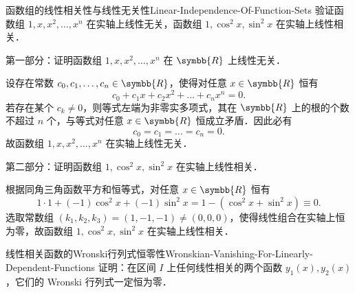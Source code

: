 \begin{problem}{函数组的线性相关性与线性无关性}{Linear-Independence-Of-Function-Sets}
    验证函数组 $1, x, x^2, \dots, x^n$ 在实轴上线性无关，函数组 $1, \cos^2 x, \sin^2 x$ 在实轴上线性相关．
\end{problem}

\begin{myproof}
    第一部分：证明函数组 $1, x, x^2, \dots, x^n$ 在 $\symbb{R}$ 上线性无关．

    设存在常数 $c_0, c_1, \dots, c_n \in \symbb{R}$，使得对任意 $x \in \symbb{R}$ 恒有
    \begin{equation}
        c_0 + c_1 x + c_2 x^2 + \dots + c_n x^n = 0.
    \end{equation}
    若存在某个 $c_k \neq 0$，则等式左端为非零实多项式，其在 $\symbb{R}$ 上的根的个数不超过 $n$ 个，与等式对任意 $x \in \symbb{R}$ 恒成立矛盾．因此必有
    \begin{equation}
        c_0 = c_1 = \dots = c_n = 0.
    \end{equation}
    故函数组 $1, x, x^2, \dots, x^n$ 在实轴上线性无关．

    第二部分：证明函数组 $1, \cos^2 x, \sin^2 x$ 在实轴上线性相关．

    根据同角三角函数平方和恒等式，对任意 $x \in \symbb{R}$ 恒有
    \begin{equation}
        1 \cdot 1 + (-1)\cos^2 x + (-1)\sin^2 x = 1 - (\cos^2 x + \sin^2 x) \equiv 0.
    \end{equation}
    选取常数组 $(k_1, k_2, k_3) = (1, -1, -1) \neq (0, 0, 0)$，使得线性组合在实轴上恒为零，故函数组 $1, \cos^2 x, \sin^2 x$ 在实轴上线性相关．
\end{myproof}

\begin{problem}{线性相关函数的Wronski行列式恒零性}{Wronskian-Vanishing-For-Linearly-Dependent-Functions}
    证明：在区间 $I$ 上任何线性相关的两个函数 $y_1(x), y_2(x)$，它们的 Wronski 行列式一定恒为零．
\end{problem}

